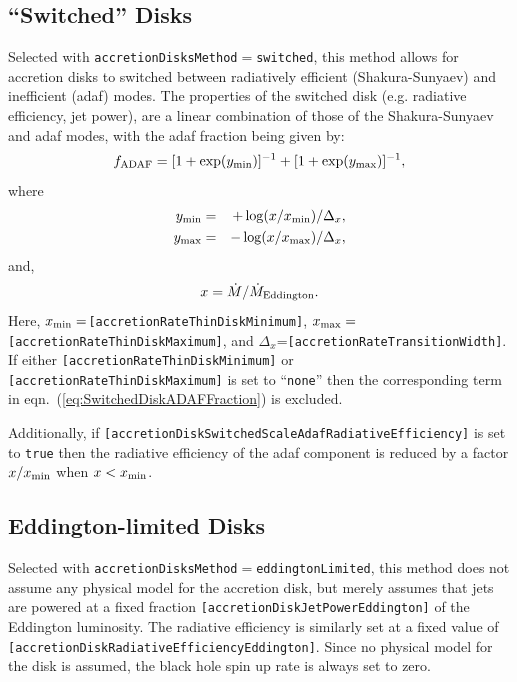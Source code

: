 \subsection{``Switched'' Disks}

Selected with {\tt accretionDisksMethod}$=${\tt switched}, this method allows for accretion disks to switched between radiatively efficient (Shakura-Sunyaev) and inefficient (\gls{adaf}) modes. The properties of the switched disk (e.g. radiative efficiency, jet power), are a linear combination of those of the Shakura-Sunyaev and \gls{adaf} modes, with the \gls{adaf} fraction being given by:
\begin{equation}
f_{\rm ADAF} = [1+\exp(y_{\rm min})]^{-1} + [1+\exp(y_{\rm max})]^{-1},
\label{eq:SwitchedDiskADAFFraction}
\end{equation}
where
\begin{eqnarray}
y_{\rm min} &=& +\log(x/x_{\rm min})/\Delta_{x}, \\
y_{\rm max} &=& -\log(x/x_{\rm max})/\Delta_{x},
\end{eqnarray}
and,
\begin{equation}
x = \dot{M} / \dot{M}_{\rm Eddington}.
\end{equation}
Here, $x_{\rm min}=${\tt [accretionRateThinDiskMinimum]}, $x_{\rm max}=${\tt [accretionRateThinDiskMaximum]}, and $\Delta_{x}$={\tt [accretionRateTransitionWidth]}. If either {\tt [accretionRateThinDiskMinimum]} or {\tt [accretionRateThinDiskMaximum]} is set to ``{\tt none}'' then the corresponding term in eqn.~(\ref{eq:SwitchedDiskADAFFraction}) is excluded.

Additionally, if {\tt [accretionDiskSwitchedScaleAdafRadiativeEfficiency]} is set to {\tt true} then the radiative efficiency of the \gls{adaf} component is reduced by a factor $x/x_{\rm min}$ when $x<x_{\rm min}$.

\subsection{Eddington-limited Disks}

Selected with {\tt accretionDisksMethod}$=${\tt eddingtonLimited}, this method does not assume any physical model for the accretion disk, but merely assumes that jets are powered at a fixed fraction {\tt [accretionDiskJetPowerEddington]} of the Eddington luminosity. The radiative efficiency is similarly set at a fixed value of {\tt [accretionDiskRadiativeEfficiencyEddington]}. Since no physical model for the disk is assumed, the black hole spin up rate is always set to zero.

